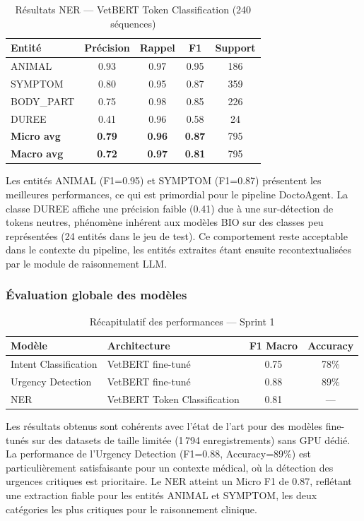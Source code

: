 \begin{table}[H]
\centering
\caption{Résultats NER — VetBERT Token Classification (240 séquences)}
\label{tab:ner-results}
\renewcommand{\arraystretch}{1.4}
\begin{tabular}{|l|c|c|c|c|}
\hline
\textbf{Entité} & \textbf{Précision} &
\textbf{Rappel} & \textbf{F1} & \textbf{Support} \\
\hline
ANIMAL     & 0.93 & 0.97 & 0.95 & 186 \\
SYMPTOM    & 0.80 & 0.95 & 0.87 & 359 \\
BODY\_PART & 0.75 & 0.98 & 0.85 & 226 \\
DUREE      & 0.41 & 0.96 & 0.58 &  24 \\
\hline
\textbf{Micro avg} & \textbf{0.79} & \textbf{0.96} & \textbf{0.87} & 795 \\
\hline
\textbf{Macro avg} & \textbf{0.72} & \textbf{0.97} & \textbf{0.81} & 795 \\
\hline
\end{tabular}
\end{table}

Les entités ANIMAL (F1=0.95) et SYMPTOM (F1=0.87) présentent les meilleures performances, ce qui est primordial pour le pipeline DoctoAgent. La classe DUREE affiche une précision faible (0.41) due à une sur-détection de tokens neutres, phénomène inhérent aux modèles BIO sur des classes peu représentées (24 entités dans le jeu de test). Ce comportement reste acceptable dans le contexte du pipeline, les entités extraites étant ensuite recontextualisées par le module de raisonnement LLM.

\subsubsection{Évaluation globale des modèles}

\begin{table}[H]
\centering
\caption{Récapitulatif des performances — Sprint 1}
\label{tab:eval-global}
\renewcommand{\arraystretch}{1.4}
\begin{tabular}{|l|l|c|c|}
\hline
\textbf{Modèle} & \textbf{Architecture} &
\textbf{F1 Macro} & \textbf{Accuracy} \\
\hline
Intent Classification & VetBERT fine-tuné           & 0.75 & 78\% \\
Urgency Detection     & VetBERT fine-tuné           & 0.88 & 89\% \\
NER                   & VetBERT Token Classification & 0.81 & ---  \\
\hline
\end{tabular}
\end{table}

Les résultats obtenus sont cohérents avec l'état de l'art pour des modèles fine-tunés sur des datasets de taille limitée (1\,794 enregistrements) sans GPU dédié. La performance de l'Urgency Detection (F1=0.88, Accuracy=89\%) est particulièrement satisfaisante pour un contexte médical, où la détection des urgences critiques est prioritaire. Le NER atteint un Micro F1 de 0.87, reflétant une extraction fiable pour les entités ANIMAL et SYMPTOM, les deux catégories les plus critiques pour le raisonnement clinique.
